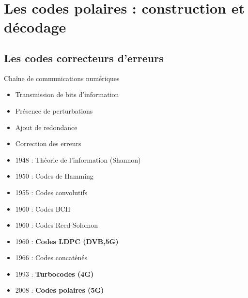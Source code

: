 

\section[Introduction]{Les codes polaires : construction et décodage}
\subsection*{Les codes correcteurs d'erreurs}

\begin{frame}[c]{Chaîne de communications numériques}
	\begin{center}
	\end{center}
	\begin{itemize}
		\item<1-> Transmission de bits d'information
		\item<1-> Présence de perturbations
		\item<2-> Ajout de redondance
		\item<4-> Correction des erreurs
	\end{itemize}
\end{frame}

\begin{frame}
\vfill
	\begin{itemize}
		\item 1948 : Théorie de l’information (Shannon)
		\item 1950 : Codes de Hamming
		\item 1955 : Codes convolutifs
		\item 1960 : Codes BCH
		\item 1960 : Codes Reed-Solomon
		\item 1960 : \textbf{Codes LDPC (DVB,5G)}
		\item 1966 : Codes concaténés
		\item 1993 : \textbf{Turbocodes (4G)}
		\item 2008 : \textbf{Codes polaires (5G)}
	\end{itemize}
	\vfill
\end{frame}

\begin{frame}[c]
	\tableofcontents[
	subsectionstyle=hide,
	]
\end{frame}


